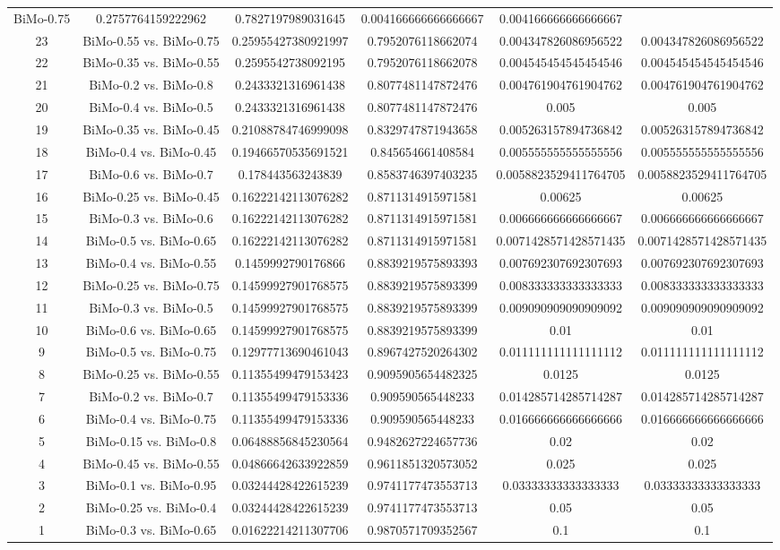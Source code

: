 \documentclass[a4paper,10pt]{article}
\begin{document}
\begin{landscape}
\begin{table}[!htp]
\begin{tabular}{cccccc}
BiMo-0.75&0.2757764159222962&0.7827197989031645&0.004166666666666667&0.004166666666666667\\23&BiMo-0.55 vs. BiMo-0.75&0.25955427380921997&0.7952076118662074&0.004347826086956522&0.004347826086956522\\22&BiMo-0.35 vs. BiMo-0.55&0.2595542738092195&0.7952076118662078&0.004545454545454546&0.004545454545454546\\21&BiMo-0.2 vs. BiMo-0.8&0.2433321316961438&0.8077481147872476&0.004761904761904762&0.004761904761904762\\20&BiMo-0.4 vs. BiMo-0.5&0.2433321316961438&0.8077481147872476&0.005&0.005\\19&BiMo-0.35 vs. BiMo-0.45&0.21088784746999098&0.8329747871943658&0.005263157894736842&0.005263157894736842\\18&BiMo-0.4 vs. BiMo-0.45&0.19466570535691521&0.845654661408584&0.005555555555555556&0.005555555555555556\\17&BiMo-0.6 vs. BiMo-0.7&0.178443563243839&0.8583746397403235&0.0058823529411764705&0.0058823529411764705\\16&BiMo-0.25 vs. BiMo-0.45&0.16222142113076282&0.8711314915971581&0.00625&0.00625\\15&BiMo-0.3 vs. BiMo-0.6&0.16222142113076282&0.8711314915971581&0.006666666666666667&0.006666666666666667\\14&BiMo-0.5 vs. BiMo-0.65&0.16222142113076282&0.8711314915971581&0.0071428571428571435&0.0071428571428571435\\13&BiMo-0.4 vs. BiMo-0.55&0.1459992790176866&0.8839219575893393&0.007692307692307693&0.007692307692307693\\12&BiMo-0.25 vs. BiMo-0.75&0.14599927901768575&0.8839219575893399&0.008333333333333333&0.008333333333333333\\11&BiMo-0.3 vs. BiMo-0.5&0.14599927901768575&0.8839219575893399&0.009090909090909092&0.009090909090909092\\10&BiMo-0.6 vs. BiMo-0.65&0.14599927901768575&0.8839219575893399&0.01&0.01\\9&BiMo-0.5 vs. BiMo-0.75&0.12977713690461043&0.8967427520264302&0.011111111111111112&0.011111111111111112\\8&BiMo-0.25 vs. BiMo-0.55&0.11355499479153423&0.9095905654482325&0.0125&0.0125\\7&BiMo-0.2 vs. BiMo-0.7&0.11355499479153336&0.909590565448233&0.014285714285714287&0.014285714285714287\\6&BiMo-0.4 vs. BiMo-0.75&0.11355499479153336&0.909590565448233&0.016666666666666666&0.016666666666666666\\5&BiMo-0.15 vs. BiMo-0.8&0.06488856845230564&0.9482627224657736&0.02&0.02\\4&BiMo-0.45 vs. BiMo-0.55&0.04866642633922859&0.9611851320573052&0.025&0.025\\3&BiMo-0.1 vs. BiMo-0.95&0.03244428422615239&0.9741177473553713&0.03333333333333333&0.03333333333333333\\2&BiMo-0.25 vs. BiMo-0.4&0.03244428422615239&0.9741177473553713&0.05&0.05\\1&BiMo-0.3 vs. BiMo-0.65&0.01622214211307706&0.9870571709352567&0.1&0.1\\\hline

\end{tabular}
\end{table}
\end{landscape}
\end{document}
